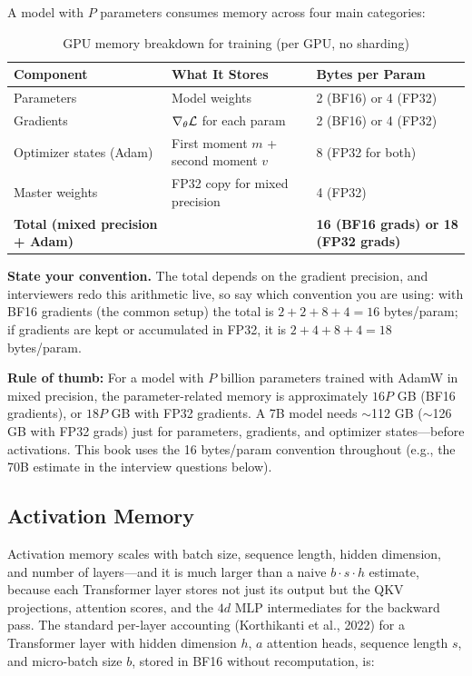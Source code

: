 A model with $P$ parameters consumes memory across four main categories:

\begin{table}[H]
\centering
\caption{GPU memory breakdown for training (per GPU, no sharding)}
\begin{tabularx}{\textwidth}{lXl}
\toprule
\textbf{Component} & \textbf{What It Stores} & \textbf{Bytes per Param} \\
\midrule
Parameters & Model weights & 2 (BF16) or 4 (FP32) \\
Gradients & $\nabla_\theta \mathcal{L}$ for each param & 2 (BF16) or 4 (FP32) \\
Optimizer states (Adam) & First moment $m$ + second moment $v$ & 8 (FP32 for both) \\
Master weights & FP32 copy for mixed precision & 4 (FP32) \\
\midrule
\textbf{Total (mixed precision + Adam)} & & \textbf{16 (BF16 grads) or 18 (FP32 grads)} \\
\bottomrule
\end{tabularx}
\end{table}

\textbf{State your convention.} The total depends on the gradient precision, and interviewers redo this arithmetic live, so say which convention you are using: with BF16 gradients (the common setup) the total is $2 + 2 + 8 + 4 = 16$ bytes/param; if gradients are kept or accumulated in FP32, it is $2 + 4 + 8 + 4 = 18$ bytes/param.

\textbf{Rule of thumb:} For a model with $P$ billion parameters trained with AdamW in mixed precision, the parameter-related memory is approximately $16P$ GB (BF16 gradients), or $18P$ GB with FP32 gradients. A 7B model needs $\sim$112 GB ($\sim$126 GB with FP32 grads) just for parameters, gradients, and optimizer states---before activations. This book uses the 16 bytes/param convention throughout (e.g., the 70B estimate in the interview questions below).

\subsection{Activation Memory}

Activation memory scales with batch size, sequence length, hidden dimension, and number of layers---and it is much larger than a naive $b \cdot s \cdot h$ estimate, because each Transformer layer stores not just its output but the QKV projections, attention scores, and the $4d$ MLP intermediates for the backward pass. The standard per-layer accounting (Korthikanti et al., 2022) for a Transformer layer with hidden dimension $h$, $a$ attention heads, sequence length $s$, and micro-batch size $b$, stored in BF16 without recomputation, is:

